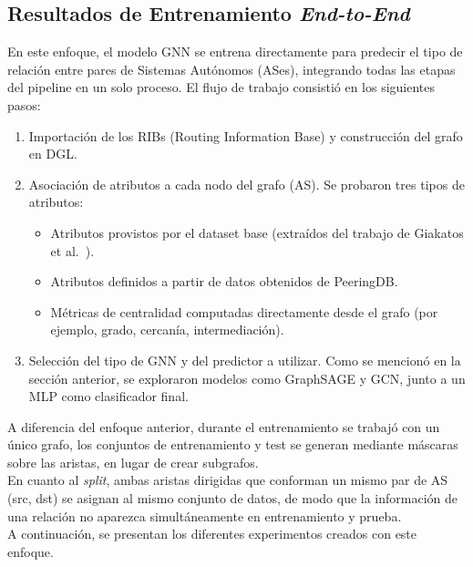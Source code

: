\subsection{Resultados de Entrenamiento \textit{End-to-End}} \label{sec:entrenamiento_end_to_end}

En este enfoque, el modelo GNN se entrena directamente para predecir el tipo de relación entre pares de Sistemas Autónomos (ASes), integrando todas las etapas del pipeline en un solo proceso. El flujo de trabajo consistió en los siguientes pasos:
\begin{enumerate}
    \item Importación de los RIBs (Routing Information Base) y construcción del grafo en DGL.
    \item Asociación de atributos a cada nodo del grafo (AS). Se probaron tres tipos de atributos:
    \begin{itemize}
        \item Atributos provistos por el dataset base (extraídos del trabajo de Giakatos et al.~\cite{BenchmarkingGNN}).
        \item Atributos definidos a partir de datos obtenidos de PeeringDB.
        \item Métricas de centralidad computadas directamente desde el grafo (por ejemplo, grado, cercanía, intermediación).
    \end{itemize}
    \item Selección del tipo de GNN y del predictor a utilizar. Como se mencionó en la sección anterior, se exploraron modelos como GraphSAGE y GCN, junto a un MLP como clasificador final.

\end{enumerate}

A diferencia del enfoque anterior, durante el entrenamiento se trabajó con un único grafo, los conjuntos de entrenamiento y test se generan mediante máscaras sobre las aristas, en lugar de crear subgrafos.\\

En cuanto al \textit{split}, ambas aristas dirigidas que conforman un mismo par de AS (src, dst) se asignan al mismo conjunto de datos, de modo que la información de una relación no aparezca simultáneamente en entrenamiento y prueba.\\


A continuación, se presentan los diferentes experimentos creados con este enfoque.\\



